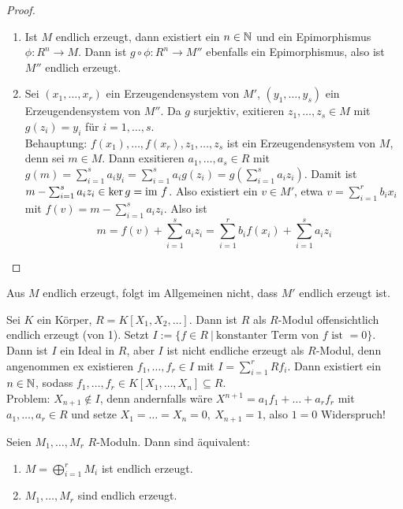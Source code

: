 \begin{proof}
	\begin{enumerate}[label=\alph*)]
		\item Ist $M$ endlich erzeugt, dann existiert ein $n\in \mathbb{N}$ und ein Epimorphismus $\phi:R^n \to M$. Dann ist $g\circ \phi:R^n \to M''$ ebenfalls ein Epimorphismus, also ist $M''$ endlich erzeugt.
		\item Sei $(x_1, \ldots, x_r)$ ein Erzeugendensystem von $M'$, $(y_1, \ldots, y_s)$ ein Erzeugendensystem von $M''$. Da $g$ surjektiv, exitieren $z_1, \ldots, z_s\in M$ mit $g(z_i) = y_i$ für $i=1, \ldots, s$. \\
		Behauptung: $f(x_1), \ldots, f(x_r), z_1, \ldots, z_s$ ist ein Erzeugendensystem von $M$, denn sei $m\in M$. Dann exsitieren $a_1, \ldots, a_s\in R$ mit $g(m) = \sum_{i=1}^s a_i y_i = \sum_{i=1}^s a_i g(z_i) = g(\sum_{i=1}^s a_i z_i)$. Damit ist $m- \sum_{i=1}^s a_i z_i \in \ker g = \operatorname{\text{im}\,} f$. Also existiert ein $v\in M'$, etwa $v= \sum_{i=1}^r b_i x_i$ mit $f(v) = m - \sum_{i=1}^s a_i z_i $. Also ist 
		$$m=f(v) + \sum_{i=1}^sa_i z_i = \sum_{i=1}^r b_i f(x_i) + \sum_{i=1}^s a_i z_i$$ 
	\end{enumerate}
\end{proof}
\begin{anm}
	Aus $M$ endlich erzeugt, folgt im Allgemeinen nicht, dass $M'$ endlich erzeugt ist.
\end{anm}
\begin{bsp}
	Sei $K$ ein Körper, $R=K[X_1, X_2, \ldots]$. Dann ist $R$ als $R$-Modul offensichtlich endlich erzeugt (von 1). Setzt $I:= \{f\in R \ | \ \text{konstanter Term von } f \text{ ist } =0\}$. Dann ist $I$ ein Ideal in $R$, aber $I$ ist nicht endliche erzeugt als $R$-Modul, denn angenommen ex existieren $f_1, \ldots, f_r\in I$ mit $I = \sum_{i=1}^rRf_i$. Dann existiert ein $n\in \mathbb{N}$, sodass $f_1, \ldots, f_r\in K[X_1, \ldots, X_n] \subseteq R$. \\
	Problem: $X_{n+1} \notin I$, denn andernfalls wäre $X^{n+1} = a_1 f_1 + \ldots + a_rf_r$ mit $a_1, \ldots, a_r \in R$ und setze $X_1 = \ldots = X_n = 0, \ X_{n+1} = 1$, also $1=0$ Widerspruch!		
\end{bsp}
\begin{bem}
	Seien $M_1, \ldots, M_r$ $R$-Moduln. Dann sind äquivalent:
	\begin{enumerate}[label=\roman*)]
		\item $M= \bigoplus_{i=1}^r M_i$ ist endlich erzeugt.
		\item $M_1, \ldots, M_r$ sind endlich erzeugt.
	\end{enumerate}
\end{bem}
